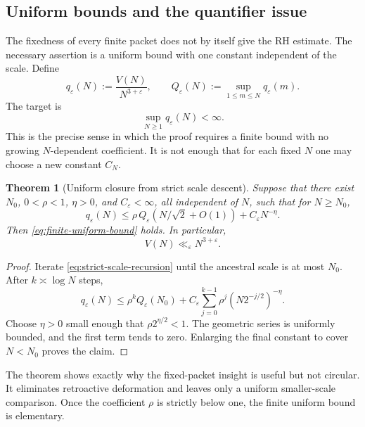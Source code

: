\documentclass[11pt]{article}
\newtheorem{theorem}{Theorem}[section]
\theoremstyle{definition}
\theoremstyle{remark}
\newcommand{\eps}{\varepsilon}
\newcommand{\1}{\mathbf{1}}
\begin{document}
\subsection{Uniform bounds and the quantifier issue}

The fixedness of every finite packet does not by itself give the RH estimate.  The
necessary assertion is a uniform bound with one constant independent of the scale.
Define
\begin{equation}
 q_\eps(N):=\frac{V(N)}{N^{3+\eps}},
 \qquad
 Q_\eps(N):=\sup_{1\le m\le N}q_\eps(m).
 \label{eq:normalized-energy-fixed}
\end{equation}
The target is
\begin{equation}
 \boxed{\displaystyle
  \sup_{N\ge1}q_\eps(N)<\infty.}
 \label{eq:finite-uniform-bound}
\end{equation}
This is the precise sense in which the proof requires a finite bound with no growing
$N$-dependent coefficient.  It is not enough that for each fixed $N$ one may choose a
new constant $C_N$.

\begin{theorem}[Uniform closure from strict scale descent]
\label{thm:uniform-closure}
Suppose that there exist $N_0$, $0<\rho<1$, $\eta>0$, and $C_\eps<\infty$, all
independent of $N$, such that for $N\ge N_0$,
\begin{equation}
 q_\eps(N)
 \le \rho\,Q_\eps\!\left(N/\sqrt2+O(1)\right)
      +C_\eps N^{-\eta}.
 \label{eq:strict-scale-recursion}
\end{equation}
Then \cref{eq:finite-uniform-bound} holds.  In particular,
\[
 V(N)\ll_\eps N^{3+\eps}.
\]
\end{theorem}

\begin{proof}
Iterate \cref{eq:strict-scale-recursion} until the ancestral scale is at most $N_0$.
After $k\asymp\log N$ steps,
\[
 q_\eps(N)
 \le \rho^kQ_\eps(N_0)
 +C_\eps\sum_{j=0}^{k-1}
   \rho^j\left(N2^{-j/2}\right)^{-\eta}.
\]
Choose $\eta>0$ small enough that $\rho2^{\eta/2}<1$.  The geometric series is
uniformly bounded, and the first term tends to zero.  Enlarging the final constant to
cover $N<N_0$ proves the claim.
\end{proof}

The theorem shows exactly why the fixed-packet insight is useful but not circular.
It eliminates retroactive deformation and leaves only a uniform smaller-scale
comparison.  Once the coefficient $\rho$ is strictly below one, the finite uniform
bound is elementary.
\end{document}
